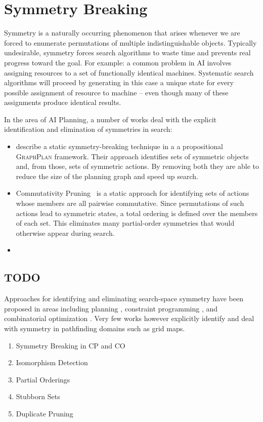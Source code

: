 \section{Symmetry Breaking}
\label{cha::lit::symmetry}
Symmetry is a naturally occurring phenomenon that arises whenever we are forced
to enumerate permutations of multiple indistinguishable objects. Typically
undesirable, symmetry forces search algorithms to waste time and prevents real
progress toward the goal.  For example: a common problem in AI involves
assigning resources to a set of functionally identical machines. Systematic
search algorithms will proceed by generating in this case a unique state for
every possible assignment of resource to machine -- even though many of these
assignments produce identical results. 

In the area of AI Planning, a number of works deal with the explicit identification
and elimination of symmetries in search:

\begin{itemize}
\item \cite{fox99} describe a static symmetry-breaking technique in a 
a propositional \textsc{GraphPlan} framework. Their
approach identifies sets of symmetric objects and, from those, sets
of symmetric actions. By removing both they are able to reduce the size
of the planning graph and speed up search.
\item Commutativity Pruning~\cite{haslum00} is a static approach for 
identifying sets of actions whose members are all pairwise commutative.
Since permutations of such actions lead to symmetric states, a total
ordering is defined over the members of each set. This eliminates
many partial-order symmetries that would otherwise appear during search.
\item 

\end{itemize}

\subsection{TODO}
Approaches for identifying and eliminating search-space symmetry have been
proposed in areas including planning \cite{fox99}, constraint programming
\cite{gent00}, and combinatorial optimization \cite{fukunaga08}. 
Very few works however explicitly identify and deal with symmetry in pathfinding
domains such as grid maps. 

\begin{enumerate}
\item{Symmetry Breaking in CP and CO}
\item{Isomorphism Detection}
\item{Partial Orderings}
\item{Stubborn Sets}
\item{Duplicate Pruning}
\end{enumerate}

